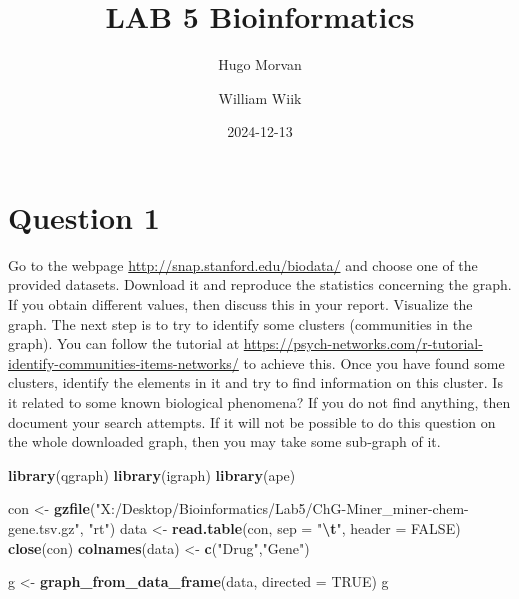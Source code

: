 \documentclass[
]{article}
\title{LAB 5 Bioinformatics}
\author{Hugo Morvan \and William Wiik}
\date{2024-12-13}
\newenvironment{Shaded}{\begin{snugshade}}{\end{snugshade}}
\newcommand{\AttributeTok}[1]{\textcolor[rgb]{0.13,0.29,0.53}{#1}}
\newcommand{\ConstantTok}[1]{\textcolor[rgb]{0.56,0.35,0.01}{#1}}
\newcommand{\FunctionTok}[1]{\textcolor[rgb]{0.13,0.29,0.53}{\textbf{#1}}}
\newcommand{\NormalTok}[1]{#1}
\newcommand{\OtherTok}[1]{\textcolor[rgb]{0.56,0.35,0.01}{#1}}
\newcommand{\SpecialCharTok}[1]{\textcolor[rgb]{0.81,0.36,0.00}{\textbf{#1}}}
\newcommand{\StringTok}[1]{\textcolor[rgb]{0.31,0.60,0.02}{#1}}
\begin{document}
\maketitle

\fancyhf{}
\fancyfoot[C]{\thepage}
\pagestyle{fancy}


\clearpage

\setcounter{tocdepth}{3}
\tableofcontents

\clearpage

\setcounter{page}{1}

\section{Question 1}\label{question-1}

Go to the webpage \url{http://snap.stanford.edu/biodata/} and choose one
of the provided datasets. Download it and reproduce the statistics
concerning the graph. If you obtain different values, then discuss this
in your report. Visualize the graph. The next step is to try to identify
some clusters (communities in the graph). You can follow the tutorial at
\url{https://psych-networks.com/r-tutorial-identify-communities-items-networks/}
to achieve this. Once you have found some clusters, identify the
elements in it and try to find information on this cluster. Is it
related to some known biological phenomena? If you do not find anything,
then document your search attempts. If it will not be possible to do
this question on the whole downloaded graph, then you may take some
sub-graph of it.

\begin{Shaded}
\begin{Highlighting}[]
\FunctionTok{library}\NormalTok{(qgraph)}
\FunctionTok{library}\NormalTok{(igraph)}
\FunctionTok{library}\NormalTok{(ape)}


\NormalTok{con }\OtherTok{\textless{}{-}} \FunctionTok{gzfile}\NormalTok{(}\StringTok{"X:/Desktop/Bioinformatics/Lab5/ChG{-}Miner\_miner{-}chem{-}gene.tsv.gz"}\NormalTok{, }\StringTok{"rt"}\NormalTok{)}
\NormalTok{data }\OtherTok{\textless{}{-}} \FunctionTok{read.table}\NormalTok{(con, }\AttributeTok{sep =} \StringTok{"}\SpecialCharTok{\textbackslash{}t}\StringTok{"}\NormalTok{, }\AttributeTok{header =} \ConstantTok{FALSE}\NormalTok{)}
\FunctionTok{close}\NormalTok{(con)}
\FunctionTok{colnames}\NormalTok{(data) }\OtherTok{\textless{}{-}} \FunctionTok{c}\NormalTok{(}\StringTok{"Drug"}\NormalTok{,}\StringTok{"Gene"}\NormalTok{)}

\NormalTok{g }\OtherTok{\textless{}{-}} \FunctionTok{graph\_from\_data\_frame}\NormalTok{(data, }\AttributeTok{directed =} \ConstantTok{TRUE}\NormalTok{)}
\NormalTok{g}
\end{Highlighting}
\end{Shaded}
\end{document}
